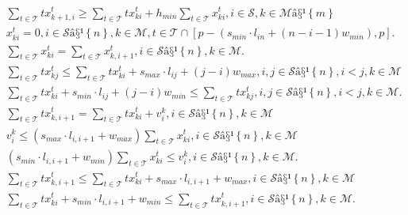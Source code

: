 \begin{align}
  & \sum_{t \in \mathcal{T}} \mathit{tx}_{k + 1 , i}^{t} \geq \sum_{t \in \mathcal{T}} \mathit{tx}_{\mathit{ki}}^{t} + h_{\mathit{min}} \sum_{t \in \mathcal{T}} x_{\mathit{ki}}^{t} , i \in \mathcal{S} , k \in \mathcal{M} â§¹ \left\{m\right\} \tag{eq\_0010} \\
  & x_{\mathit{ki}}^{t} = 0 , i \in \mathcal{S} â§¹ \left\{n\right\} , k \in \mathcal{M} , t \in \mathcal{T} \cap \left[p - \left(s_{\mathit{min}} \cdot l_{\mathit{in}} + \left(n - i - 1\right) w_{\mathit{min}}\right) , p\right] . \tag{eq\_0014} \\
  & \sum_{t \in \mathcal{T}} x_{\mathit{ki}}^{t} = \sum_{t \in \mathcal{T}} x_{k , i + 1}^{t} , i \in \mathcal{S} â§¹ \left\{n\right\} , k \in \mathcal{M} . \tag{eq\_0015} \\
  & \sum_{t \in \mathcal{T}} \mathit{tx}_{\mathit{kj}}^{t} \leq \sum_{t \in \mathcal{T}} \mathit{tx}_{\mathit{ki}}^{t} + s_{\mathit{max}} \cdot l_{\mathit{ij}} + \left(j - i\right) w_{\mathit{max}} , i , j \in \mathcal{S} â§¹ \left\{n\right\} , i < j , k \in \mathcal{M} \tag{eq\_0016} \\
  & \sum_{t \in \mathcal{T}} \mathit{tx}_{\mathit{ki}}^{t} + s_{\mathit{min}} \cdot l_{\mathit{ij}} + \left(j - i\right) w_{\mathit{min}} \leq \sum_{t \in \mathcal{T}} \mathit{tx}_{\mathit{kj}}^{t} , i , j \in \mathcal{S} â§¹ \left\{n\right\} , i < j , k \in \mathcal{M} . \tag{eq\_0017} \\
  & \sum_{t \in \mathcal{T}} \mathit{tx}_{k , i + 1}^{t} = \sum_{t \in \mathcal{T}} \mathit{tx}_{\mathit{ki}}^{t} + v_{i}^{k} , i \in \mathcal{S} â§¹ \left\{n\right\} , k \in \mathcal{M} \tag{eq\_0019} \\
  & v_{i}^{k} \leq \left(s_{\mathit{max}} \cdot l_{i , i + 1} + w_{\mathit{max}}\right) \sum_{t \in \mathcal{T}} x_{\mathit{ki}}^{t} , i \in \mathcal{S} â§¹ \left\{n\right\} , k \in \mathcal{M} \tag{eq\_0020} \\
  & \left(s_{\mathit{min}} \cdot l_{i , i + 1} + w_{\mathit{min}}\right) \sum_{t \in \mathcal{T}} x_{\mathit{ki}}^{t} \leq v_{i}^{k} , i \in \mathcal{S} â§¹ \left\{n\right\} , k \in \mathcal{M} . \tag{eq\_0021} \\
  & \sum_{t \in \mathcal{T}} \mathit{tx}_{k , i + 1}^{t} \leq \sum_{t \in \mathcal{T}} \mathit{tx}_{\mathit{ki}}^{t} + s_{\mathit{max}} \cdot l_{i , i + 1} + w_{\mathit{max}} , i \in \mathcal{S} â§¹ \left\{n\right\} , k \in \mathcal{M} \tag{eq\_0023} \\
  & \sum_{t \in \mathcal{T}} \mathit{tx}_{\mathit{ki}}^{t} + s_{\mathit{min}} \cdot l_{i , i + 1} + w_{\mathit{min}} \leq \sum_{t \in \mathcal{T}} \mathit{tx}_{k , i + 1}^{t} , i \in \mathcal{S} â§¹ \left\{n\right\} , k \in \mathcal{M} . \tag{eq\_0024} \\
\end{align}
